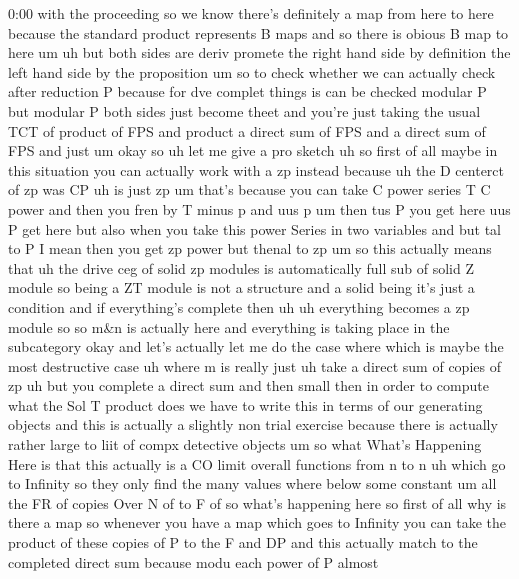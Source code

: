 \begin{unfinished}{0:00}
with  the  proceeding  so  we  know  there's
definitely  a  map  from  here  to  here
because  the  standard  product  represents
B  maps  and  so  there  is  obious  B  map  to
here
um  uh  but  both  sides  are  deriv  promete
the  right  hand  side  by  definition  the
left  hand  side  by  the  proposition  um  so
to  check  whether
we  can  actually  check  after  reduction  P
because  for  dve  complet  things  is  can  be
checked  modular  P  but  modular  P  both
sides  just  become  theet  and  you're  just
taking  the  usual  TCT  of  product  of  FPS
and  product  a  direct  sum  of  FPS  and  a
direct  sum  of  FPS  and
just
um  okay  so
uh  let  me  give  a  pro
sketch  uh  so  first  of  all  maybe  in  this
situation  you  can  actually  work  with  a
zp  instead  because  uh  the  D  centerct  of
zp  was  CP  uh  is  just
zp  um  that's
because  you  can  take  C  power  series
T  C
power  and  then  you  fren  by  T  minus  p  and
uus  p  um  then  tus  P  you  get  here  uus  P
get  here  but  also  when  you  take  this
power  Series  in  two  variables  and  but
tal  to  P  I  mean  then  you  get  zp  power
but  thenal  to  zp  um  so  this  actually
means
that  uh  the  drive  ceg  of  solid  zp
modules  is  automatically  full  sub  of
solid  Z
module  so  being  a  ZT  module  is  not  a
structure  and  a  solid  being  it's  just  a
condition  and  if  everything's  complete
then
uh  uh  everything  becomes  a  zp  module  so
so  m\&n  is  actually  here
and  everything  is  taking  place  in  the
subcategory  okay  and  let's  actually  let
me  do  the  case
where  which  is  maybe  the  most
destructive  case  uh  where  m  is  really
just  uh  take  a  direct  sum  of  copies  of
zp  uh  but  you  complete  a  direct  sum  and
then
small
then  in  order  to  compute  what  the  Sol  T
product  does  we  have  to  write  this  in
terms  of  our  generating  objects  and  this
is  actually  a  slightly  non  trial
exercise  because  there  is  actually
rather  large  to  liit  of  compx  detective
objects  um  so  what  What's  Happening  Here
is  that  this  actually  is  a  CO
limit  overall
functions  from  n  to  n  uh  which  go  to
Infinity
so  they  only  find  the  many  values  where
below  some
constant
um  all  the  FR  of  copies  Over  N  of  to  F
of  so  what's  happening  here  so  first  of
all  why  is  there  a
map  so  whenever  you  have  a  map  which
goes  to  Infinity  you  can  take  the
product  of  these  copies  of  P  to  the  F
and  DP  and  this  actually  match  to  the
completed  direct
sum  because  modu  each  power  of  P  almost

\end{unfinished}
